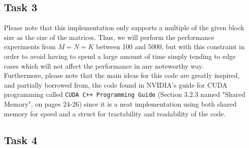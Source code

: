 \documentclass[9pt]{article}
\begin{document}
\subsection{Task 3}
Please note that this implementation only supports a multiple of the given block size as the size of the matrices. Thus, we will perform the performance experiments from $M=N=K$ between 100 and 5000, but with this constraint in order to avoid having to spend a large amount of time simply tending to edge cases which will not affect the performance in any noteworthy way. \\

Furthermore, please note that the main ideas for this code are greatly inspired, and partially borrowed from, the code found in NVIDIA's guide for CUDA programming called \texttt{CUDA C++ Programming Guide} (Section 3.2.3 named "Shared Memory", on pages 24-26) since it is a neat implementation using both shared memory for speed and a struct for tractability and readability of the code.
\subsection{Task 4}
\end{document}
